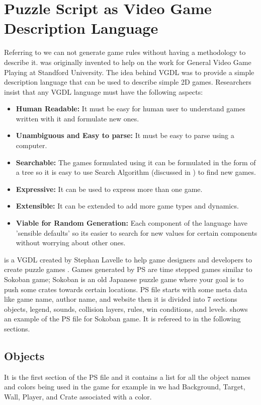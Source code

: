 \section{Puzzle Script as Video Game Description Language}
Referring to  we can not generate game rules without having a methodology to describe it.  was originally invented to help on the work for General Video Game Playing at Standford University. The idea behind VGDL was to provide a simple description language that can be used to describe simple 2D games. Researchers insist that any VGDL language must have the following aspects:\cite{vgdl}
\begin{itemize}\itemsep0pt \parskip0pt 
	\item \textbf{Human Readable:} It must be easy for human user to understand games written with it and formulate new ones.
	\item \textbf{Unambiguous and Easy to parse:} It must be easy to parse using a computer.
	\item \textbf{Searchable:} The games formulated using it can be formulated in the form of a tree so it is easy to use Search Algorithm (discussed in ) to find new games.
	\item \textbf{Expressive:} It can be used to express more than one game.
	\item \textbf{Extensible:} It can be extended to add more game types and dynamics.
	\item \textbf{Viable for Random Generation:} Each component of the language have 'sensible defaults' so its easier to search for new values for certain components without worrying about other ones.
\end{itemize}

 is a VGDL created by Stephan Lavelle to help game designers and developers to create puzzle games \cite{puzzleScript}. Games generated by PS are time stepped games similar to Sokoban game; Sokoban is an old Japanese puzzle game where your goal is to push some crates towards certain locations\cite{sokoban}. PS file starts with some meta data like game name, author name, and website then it is divided into 7 sections objects, legend, sounds, collision layers, rules, win conditions, and levels.  shows an example of the PS file for Sokoban game. It is refereed to in the following sections.

\subsection{Objects}
It is the first section of the PS file and it contains a list for all the object names and colors being used in the game for example in  we had Background, Target, Wall, Player, and Crate associated with a color.

